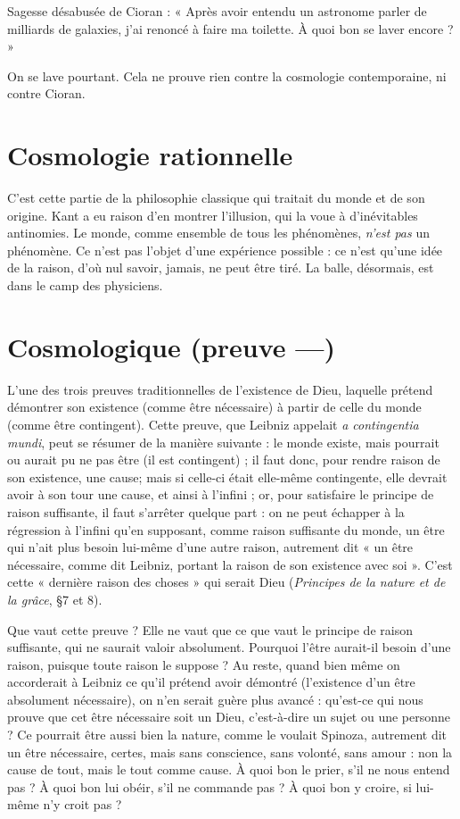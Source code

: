 Sagesse désabusée de Cioran : « Après avoir entendu un astronome parler
de milliards de galaxies, j’ai renoncé à faire ma toilette. À quoi bon se laver
encore ? »

On se lave pourtant. Cela ne prouve rien contre la cosmologie contemporaine, ni
contre Cioran.

\section{Cosmologie rationnelle}
C’est cette partie de la philosophie classique
qui traitait du monde et de son
origine. Kant a eu raison d’en montrer l'illusion, qui la voue à d’inévitables
antinomies. Le monde, comme ensemble de tous les phénomènes, {\it n'est pas} un
phénomène. Ce n’est pas l’objet d’une expérience possible : ce n’est qu’une idée
de la raison, d’où nul savoir, jamais, ne peut être tiré. La balle, désormais, est
dans le camp des physiciens.

\section{Cosmologique (preuve —)}
L'une des trois preuves traditionnelles de
l'existence de Dieu, laquelle prétend
démontrer son existence (comme être nécessaire) à partir de celle du monde
(comme être contingent). Cette preuve, que Leibniz appelait {\it a contingentia
mundi}, peut se résumer de la manière suivante : le monde existe, mais pourrait
ou aurait pu ne pas être (il est contingent) ; il faut donc, pour rendre raison de
son existence, une cause; mais si celle-ci était elle-même contingente, elle
devrait avoir à son tour une cause, et ainsi à l'infini ; or, pour satisfaire le principe
de raison suffisante, il faut s’arrêter quelque part : on ne peut échapper à
la régression à l'infini qu’en supposant, comme raison suffisante du monde, un
être qui n’ait plus besoin lui-même d’une autre raison, autrement dit « un être
nécessaire, comme dit Leibniz, portant la raison de son existence avec soi ».
C’est cette « dernière raison des choses » qui serait Dieu ({\it Principes de la nature
et de la grâce}, \S 7 et 8).

Que vaut cette preuve ? Elle ne vaut que ce que vaut le principe de raison
suffisante, qui ne saurait valoir absolument. Pourquoi l’être aurait-il besoin
d’une raison, puisque toute raison le suppose ? Au reste, quand bien même on
accorderait à Leibniz ce qu’il prétend avoir démontré (l’existence d’un être
absolument nécessaire), on n’en serait guère plus avancé : qu’est-ce qui nous
prouve que cet être nécessaire soit un Dieu, c’est-à-dire un sujet ou une
personne ? Ce pourrait être aussi bien la nature, comme le voulait Spinoza,
autrement dit un être nécessaire, certes, mais sans conscience, sans volonté, sans
amour : non la cause de tout, mais le tout comme cause. À quoi bon le prier,
s’il ne nous entend pas ? À quoi bon lui obéir, s’il ne commande pas ? À quoi
bon y croire, si lui-même n’y croit pas ?

